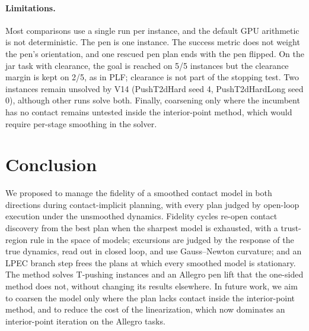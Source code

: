 \documentclass[11pt]{article}
\theoremstyle{remark}
\begin{document}
\paragraph{Limitations.} Most comparisons use a single run per instance, and the default GPU arithmetic is not deterministic. The pen is one instance. The success metric does not weight the pen's orientation, and one rescued pen plan ends with the pen flipped. On the jar task with clearance, the goal is reached on 5/5 instances but the clearance margin is kept on 2/5, as in PLF; clearance is not part of the stopping test. Two instances remain unsolved by V14 (PushT2dHard seed 4, PushT2dHardLong seed 0), although other runs solve both. Finally, coarsening only where the incumbent has no contact remains untested inside the interior-point method, which would require per-stage smoothing in the solver.

\section{Conclusion}

We proposed to manage the fidelity of a smoothed contact model in both directions during contact-implicit planning, with every plan judged by open-loop execution under the unsmoothed dynamics. Fidelity cycles re-open contact discovery from the best plan when the sharpest model is exhausted, with a trust-region rule in the space of models; excursions are judged by the response of the true dynamics, read out in closed loop, and use Gauss--Newton curvature; and an LPEC branch step frees the plans at which every smoothed model is stationary. The method solves T-pushing instances and an Allegro pen lift that the one-sided method does not, without changing its results elsewhere. In future work, we aim to coarsen the model only where the plan lacks contact inside the interior-point method, and to reduce the cost of the linearization, which now dominates an interior-point iteration on the Allegro tasks.
\end{document}
